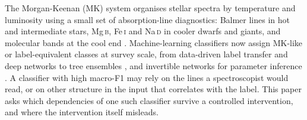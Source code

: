 \documentclass[11pt,a4paper]{article}
\newcommand{\Mgb}{Mg\,\textsc{b}\xspace}
\newcommand{\NaD}{Na\,\textsc{d}\xspace}
\newcommand{\FeI}{Fe\,\textsc{i}\xspace}
\begin{document}
The Morgan-Keenan (MK) system organises stellar spectra by temperature and luminosity using a small set of absorption-line diagnostics: Balmer lines in hot and intermediate stars, \Mgb, \FeI and \NaD in cooler dwarfs and giants, and molecular bands at the cool end \citep{GrayCorbally2009}. Machine-learning classifiers now assign MK-like or label-equivalent classes at survey scale, from data-driven label transfer \citep{2015ApJ...808...16N} and deep networks \citep{2018MNRAS.475.2978F} to tree ensembles \citep{2019RAA....19..111L}, and invertible networks for parameter inference \citep{2024A&A...692A.228C}. A classifier with high macro-F1 may rely on the lines a spectroscopist would read, or on other structure in the input that correlates with the label. This paper asks which dependencies of one such classifier survive a controlled intervention, and where the intervention itself misleads.
\end{document}
